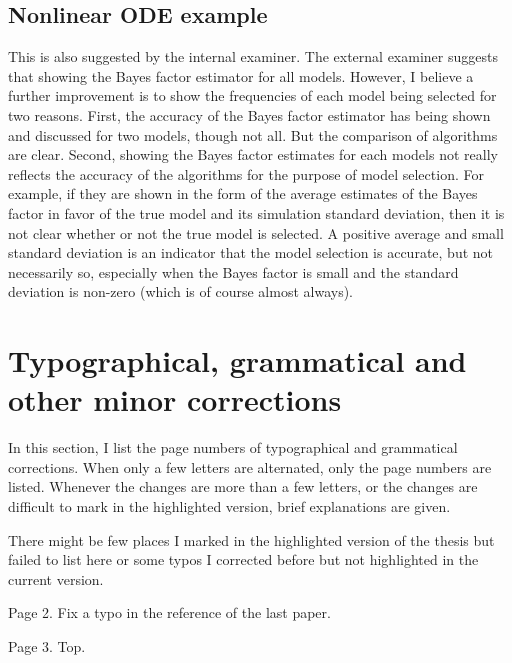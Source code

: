 \documentclass[11pt, fontset=Scala]{marticle}
\begin{document}

\subsection{Nonlinear ODE example} %
\label{sub:nonlinear_ode_example}

This is also suggested by the internal examiner. The external examiner suggests that showing the Bayes factor estimator for all models. However, I believe a further improvement is to show the frequencies of each model being selected for two reasons. First, the accuracy of the Bayes factor estimator has being shown and discussed for two models, though not all. But the comparison of algorithms are clear. Second, showing the Bayes factor estimates for each models not really reflects the accuracy of the algorithms for the purpose of model selection. For example, if they are shown in the form of the average estimates of the Bayes factor in favor of the true model and its simulation standard deviation, then it is not clear whether or not the true model is selected. A positive average and small standard deviation is an indicator that the model selection is accurate, but not necessarily so, especially when the Bayes factor is small and the standard deviation is non-zero (which is of course almost always).



\section{Typographical, grammatical and other minor corrections} %
\label{sec:typographical_and_grammatical_corrections}

In this section, I list the page numbers of typographical and grammatical corrections. When only a few letters are alternated, only the page numbers are listed. Whenever the changes are more than a few letters, or the changes are difficult to mark in the highlighted version, brief explanations are given.

There might be few places I marked in the highlighted version of the thesis but failed to list here or some typos I corrected before but not highlighted in the current version.

Page 2. Fix a typo in the reference of the last paper.

Page 3. Top.
\end{document}
